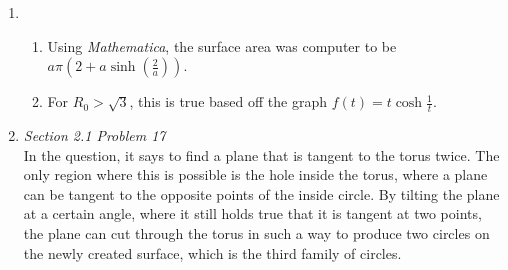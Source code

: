 \documentclass{article}
\begin{document}
\begin{enumerate}
\item

\begin{enumerate}

\item Using \textit{Mathematica}, the surface area was computer to be $a\pi(2 + a\sinh(\frac{2}{a}))$.

\item For $R_0>\sqrt{3}$, this is true based off the graph $f(t) = t\cosh{\frac{1}{t}}$.

\end{enumerate}

\item \textit{Section 2.1 Problem 17}\\

In the question, it says to find a plane that is tangent to the torus twice.
The only region where this is possible is the hole inside the torus, where a plane can be tangent to the opposite points of the inside circle.
By tilting the plane at a certain angle, where it still holds true that it is tangent at two points, the plane can cut through the torus in such a way to produce two circles on the newly created surface, which is the third family of circles.

\end{enumerate}
\end{document}
